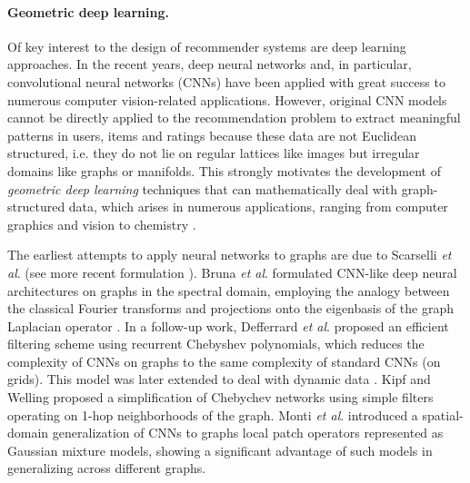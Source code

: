 \documentclass{article}
\newcommand{\etal}{\textit{et al}. }
\begin{document}
\paragraph*{Geometric deep learning.} 
Of key interest to the design of recommender systems are deep learning approaches. 
In the recent years, deep neural networks and, in particular, convolutional neural networks (CNNs) \cite{lecun1998gradient} have been applied with great success to numerous computer vision-related applications. However, original CNN models cannot be directly applied to the recommendation problem to extract meaningful patterns in users, items and ratings because these data are not Euclidean structured, i.e. they do not lie on regular lattices like images but irregular domains like graphs or manifolds. This strongly motivates the development of {\em geometric deep learning} \cite{review_new} techniques that can mathematically deal with graph-structured data, which arises in numerous applications, ranging from computer graphics and vision \cite{masci2015geodesic,WFT2015,add16,boscaini2016learning,monti2016geometric} to chemistry \cite{duv2015convolutional}. 


The earliest attempts to apply neural networks to graphs are due to Scarselli \etal \citeyear{gori2005new,GNN} (see more recent formulation \cite{GGSNN,comnets}). 
Bruna \etal \citeyear{bruna2013spectral,henaff2015deep} formulated CNN-like  deep neural architectures on graphs in the spectral domain, employing the analogy between the classical Fourier transforms and projections onto the eigenbasis of the graph Laplacian operator \cite{shuman2013emerging}. 
In a follow-up work, Defferrard \etal \citeyear{defferrard2016convolutional} proposed an efficient filtering scheme using recurrent Chebyshev polynomials, which reduces the complexity of CNNs on graphs to the same complexity of standard CNNs (on grids). This model was later extended to deal with dynamic data \cite{seo2016structured}. 
Kipf and Welling \citeyear{welling2016} proposed a simplification of Chebychev networks using simple filters operating on 1-hop neighborhoods of the graph.
Monti \etal \citeyear{monti2016geometric} introduced a spatial-domain generalization of CNNs to graphs local patch operators represented as Gaussian mixture models, showing a significant advantage of such models in generalizing across different graphs. 
\end{document}
